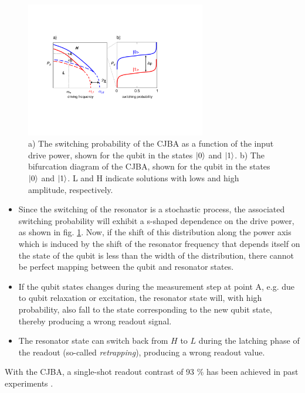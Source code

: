 \begin{figure}
	\includegraphics[width=0.7\textwidth]{./material/figures/2-qubit-processor/readout_principle}
	\caption[]{a) The switching probability of the CJBA as a function of the input drive power, shown for the qubit in the states $\left| 0 \right>$ and $\left| 1 \right>$. b) The bifurcation diagram of the CJBA, shown for the qubit in the states $\left| 0 \right>$ and $\left| 1 \right>$. L and H indicate solutions with lows and high amplitude, respectively.}
	\label{fig:readout_process_illustration}
\end{figure}

\begin{itemize}
\item Since the switching of the resonator is a stochastic process, the associated switching probability will exhibit a s-shaped dependence on the drive power, as shown in fig. \ref{fig:readout_process_illustration}. Now, if the shift of this distribution along the power axis which is induced by the shift of the resonator frequency that depends itself on the state of the qubit is less than the width of the distribution, there cannot be perfect mapping between the qubit and resonator states.
\item If the qubit states changes during the measurement step at point A, e.g. due to qubit relaxation or excitation, the resonator state will, with high probability, also fall to the state corresponding to the new qubit state, thereby producing a wrong readout signal.
\item The resonator state can switch back from $H$ to $L$ during the latching phase of the readout (so-called {\it retrapping}), producing a wrong readout value.
\end{itemize}

With the CJBA, a single-shot readout contrast of 93 \% has been achieved in past experiments \citep{mallet_single-shot_2009}.

